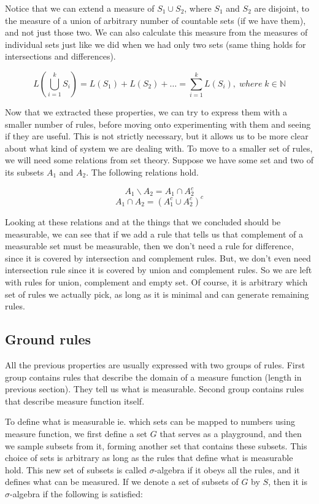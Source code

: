 \documentclass{article}
\begin{document}
Notice that we can extend a measure of $S_1 \cup S_2$, where $S_1$ and $S_2$ are disjoint, to the measure of a union of arbitrary number of countable sets (if we have them), and not just those two. We can also calculate this measure from the measures of individual sets just like we did when we had only two sets (same thing holds for intersections and differences).

\[ L(\bigcup\limits_{i=1}^{k} S_i) = L(S_1) + L(S_2) + \dots = \sum\limits_{i=1}^{k}L(S_i),\;where\;k \in \mathbb{N} \]

Now that we extracted these properties, we can try to express them with a smaller number of rules, before moving onto experimenting with them and seeing if they are useful. This is not strictly necessary, but it allows us to be more clear about what kind of system we are dealing with. To move to a smaller set of rules, we will need some relations from set theory. Suppose we have some set and two of its subsets $A_1$ and $A_2$. The following relations hold.

\[ A_1 \backslash A_2 = A_1 \cap A_2^c \]
\[ A_1 \cap A_2 = (A_1^c \cup A_2^c)^c \]

Looking at these relations and at the things that we concluded should be measurable, we can see that if we add a rule that tells us that complement of a measurable set must be measurable, then we don't need a rule for difference, since it is covered by intersection and complement rules. But, we don't even need intersection rule since it is covered by union and complement rules. So we are left with rules for union, complement and empty set.
Of course, it is arbitrary which set of rules we actually pick, as long as it is minimal and can generate remaining rules.

\subsection{Ground rules}

All the previous properties are usually expressed with two groups of rules. First group contains rules that describe the domain of a measure function (length in previous section). They tell us what is measurable. Second group contains rules that describe measure function itself.

To define what is measurable ie. which sets can be mapped to numbers using measure function, we first define a set $G$ that serves as a playground, and then we sample subsets from it, forming another set that contains these subsets. This choice of sets is arbitrary as long as the rules that define what is measurable hold. This new set of subsets is called $\sigma$-algebra if it obeys all the rules, and it defines what can be measured. If we denote a set of subsets of $G$ by $S$, then it is $\sigma$-algebra if the following is satisfied:
\end{document}
